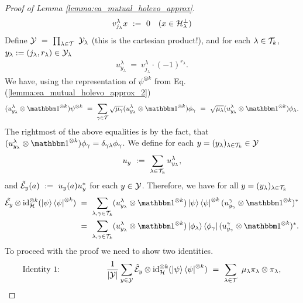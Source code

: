 \begin{proof}[Proof of Lemma \ref{lemma:ea_mutual_holevo_approx}]
\begin{align} 
v_{j_\lambda}^{\lambda} x  \ := \ 0 && (x \in {\mathcal H}_\lambda^\perp)
\end{align}
Define $\cY \ = \ \prod_{\lambda \in \cT} \ \cY_\lambda$ (this is the cartesian product!), 
and for each $\lambda \in {\mathcal T}_k$, $y_\lambda := (j_\lambda,r_\lambda) \in {\mathcal Y}_\lambda$
\begin{align*}
u_{y_\lambda}^\lambda \:=\ v_{j_\lambda}^\lambda \cdot (-1)^{r_\lambda}.
\end{align*}
We have, using the representation of $\psi^{\otimes k}$ from Eq. (\ref{lemma:ea_mutual_holevo_approx_2}) 
\begin{align}
(u_{y_\lambda}^{\lambda} \otimes \bbmeins^{\otimes k}) \psi^{\otimes k} \ 
= \ \sum_{\gamma \in \cT} \sqrt{\mu_\gamma} (u_{y_\lambda}^{\lambda} \otimes \bbmeins^{\otimes k}) \phi_\gamma  
\ = \ \sqrt{\mu_\lambda}(u_{y_\lambda}^{\lambda} \otimes \bbmeins^{\otimes k}) \phi_\lambda.
\end{align}
The rightmost of the above equalities is by the fact, that $(u_{y_{\lambda}}^\lambda \otimes \bbmeins^{\otimes k})\phi_{\gamma} = \delta_{\gamma \lambda} \phi_\gamma$. We define for each $y = (y_\lambda)_{\lambda \in {\mathcal T}_k} \in {\mathcal Y}$
\begin{align*}
u_y \ := \ \sum_{\lambda \in {\mathcal T}_k} u_{y_\lambda}^\lambda, 
\end{align*}
and $\tilde{\cE}_y(a) \ := \ u_y(a)u_y^\ast$ for each $y \in {\mathcal Y}$. Therefore, we have for all $y = (y_\lambda)_{\lambda \in {\mathcal T}_k}$ 
\begin{align*}
\tilde{\cE_y} \otimes \id_{\cH}^{\otimes k}(\ket{\psi}\bra{\psi}^{\otimes k}) \ 
&= \ \sum_{\lambda, \gamma \in \cT_k} (u_{y_\lambda}^\lambda \otimes \bbmeins^{\otimes k}) \ket{\psi}\bra{\psi}^{\otimes k}(u_{y_\gamma}^\gamma \otimes \bbmeins^{\otimes k})^\ast \\ 
&= \ \sum_{\lambda, \gamma \in \cT_k} (u_{y_\lambda}^\lambda \otimes \bbmeins^{\otimes k}) \ket{\phi_\lambda}\bra{\phi_\gamma}(u_{y_\gamma}^\gamma \otimes \bbmeins^{\otimes k})^\ast. 
\end{align*}
To proceed with the proof we need to show two identities. \\
\begin{align*}
  \text{Identity 1:} \hspace{2cm} \frac{1}{|\cY|} \sum_{y \in \cY} \tilde{\cE}_y \otimes \id_{\cH}^{\otimes k}(\ket{\psi}\bra{\psi}^{\otimes k}) \ = \ \sum_{\lambda \in \cT} \ \mu_\lambda \pi_\lambda \otimes \pi_\lambda,
\end{align*}

\end{proof}
